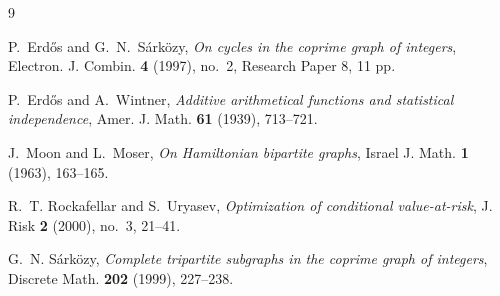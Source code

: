 \documentclass{article}
\theoremstyle{remark}
\begin{document}
\begin{thebibliography}{9}

P.~Erd\H{o}s and G.~N.~S\'ark\"ozy,
\emph{On cycles in the coprime graph of integers},
Electron. J. Combin. \textbf{4} (1997), no.~2, Research Paper 8,
11 pp.

P.~Erd\H{o}s and A.~Wintner,
\emph{Additive arithmetical functions and statistical independence},
Amer. J. Math. \textbf{61} (1939), 713--721.

J.~Moon and L.~Moser,
\emph{On Hamiltonian bipartite graphs},
Israel J. Math. \textbf{1} (1963), 163--165.

R.~T. Rockafellar and S.~Uryasev,
\emph{Optimization of conditional value-at-risk},
J. Risk \textbf{2} (2000), no.~3, 21--41.

G.~N. S\'ark\"ozy,
\emph{Complete tripartite subgraphs in the coprime graph of integers},
Discrete Math. \textbf{202} (1999), 227--238.

\end{thebibliography}
\end{document}
